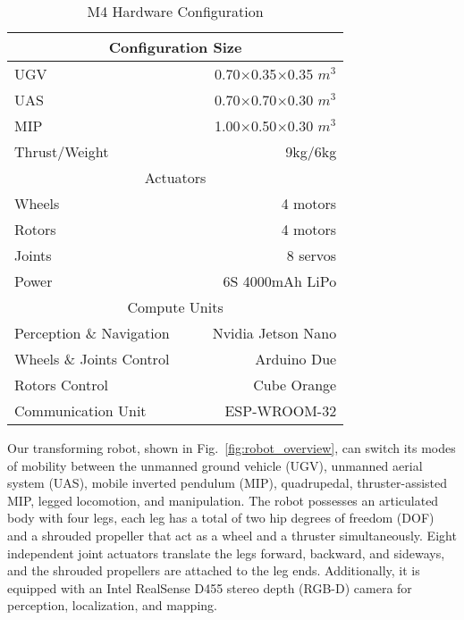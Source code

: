 \documentclass[letterpaper, 10 pt, conference]{ieeeconf}  %
\begin{document}
\begin{table}[t]
\vspace{0.08in}
\caption{M4 Hardware Configuration}
\centering
\begin{tabular}{lccr}
\hline
\multicolumn{4}{c}{Configuration Size}                                           \\ \hline
\multicolumn{1}{l}{UGV}                    & & & 0.70$\times$0.35$\times$0.35 $m^3$                   \\
\multicolumn{1}{l}{UAS}                    & & & 0.70$\times$0.70$\times$0.30 $m^3$                   \\
\multicolumn{1}{l}{MIP}                    & & & 1.00$\times$0.50$\times$0.30 $m^3$                   \\ \hline
\multicolumn{1}{l}{Thrust/Weight}          & & & 9kg/6kg                           \\ \hline
\multicolumn{4}{c}{Actuators}                                                    \\ \hline
\multicolumn{1}{l}{Wheels}                 & & & 4 motors                          \\
\multicolumn{1}{l}{Rotors}                 & & & 4 motors                          \\
\multicolumn{1}{l}{Joints}                 & & & 8 servos                          \\ \hline
\multicolumn{1}{l}{Power}                  & & & 6S 4000mAh LiPo                   \\ \hline
\multicolumn{4}{c}{Compute Units}                                                    \\ \hline
\multicolumn{1}{l}{Perception \& Navigation}      & & & Nvidia Jetson Nano                \\
\multicolumn{1}{l}{Wheels \& Joints Control}&& & Arduino Due                       \\
\multicolumn{1}{l}{Rotors Control}         & & & Cube Orange                       \\
\multicolumn{1}{l}{Communication Unit}           & & & ESP-WROOM-32 \\ \hline
\end{tabular}
\label{tab:hardware_config}
\vspace{-0.5cm}
\end{table}

Our transforming robot, shown in Fig.~\ref{fig:robot_overview}, can switch its modes of mobility between the unmanned ground vehicle (UGV), unmanned aerial system (UAS), mobile inverted pendulum (MIP), quadrupedal, thruster-assisted MIP, legged locomotion, and manipulation. The robot possesses an articulated body with four legs, each leg has a total of two hip degrees of freedom (DOF) and a shrouded propeller that act as a wheel and a thruster simultaneously. Eight independent joint actuators translate the legs forward, backward, and sideways, and the shrouded propellers are attached to the leg ends. Additionally, it is equipped with an Intel RealSense D455 stereo depth (RGB-D) camera for perception, localization, and mapping.
\end{document}
